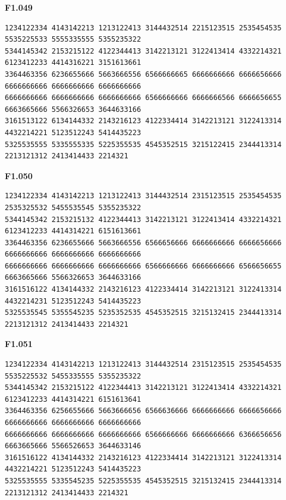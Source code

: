 \noindent\begin{minipage}{\linewidth}\textbf{F1.049}
\begin{lstlisting}
1234122334 4143142213 1213122413 3144432514 2215123515 2535454535 5535225533 5555335555 5355235322
5344145342 2153215122 4122344413 3142213121 3122413414 4332214321 6123412233 4414316221 3151613661
3364463356 6236655666 5663666556 6566666665 6666666666 6666656666 6666666666 6666666666 6666666666
6666666666 6666666666 6666666666 6566666666 6666666566 6666656655 6663665666 5566326653 3644633166
3161513122 6134144332 2143216123 4122334414 3142213121 3122413314 4432214221 5123512243 5414435223
5325535555 5335555335 5225355535 4545352515 3215122415 2344413314 2213121312 2413414433 2214321
\end{lstlisting}
\end{minipage}\par\smallskip

\noindent\begin{minipage}{\linewidth}\textbf{F1.050}
\begin{lstlisting}
1234122334 4143142213 1213122413 3144432514 2315123515 2535454535 2535325532 5455535545 5355235322
5344145342 2153215132 4122344413 3142213121 3122413414 4332214321 6123412233 4414314221 6151613661
3364463356 6236655666 5663666556 6566656666 6666666666 6666656666 6666666666 6666666666 6666666666
6666666666 6666666666 6666666666 6566666666 6666666666 6566656655 6663665666 5566326653 3644633166
3161516122 4134144332 2143216123 4122334414 3142213121 3122413314 4432214231 5123512243 5414435223
5325535545 5355545235 5235352535 4545352515 3215132415 2344413314 2213121312 2413414433 2214321
\end{lstlisting}
\end{minipage}\par\smallskip

\noindent\begin{minipage}{\linewidth}\textbf{F1.051}
\begin{lstlisting}
1234122334 4143142213 1213122413 3144432514 2315123515 2535454535 5535225532 5455335555 5355235322
5344145342 2153215122 4122344413 3142213121 3122413414 4332214321 6123412233 4414314221 6151613641
3364463356 6256655666 5663666656 6566636666 6666666666 6666656666 6666666666 6666666666 6666666666
6666666666 6666666666 6666666666 6566666666 6666666666 6366656656 6663665666 5566526653 3644633146
3161516122 4134144332 2143216123 4122334414 3142213121 3122413314 4432214221 5123512243 5414435223
5325535555 5335545235 5225355535 4545352515 3215132415 2344413314 2213121312 2413414433 2214321
\end{lstlisting}
\end{minipage}\par\smallskip

